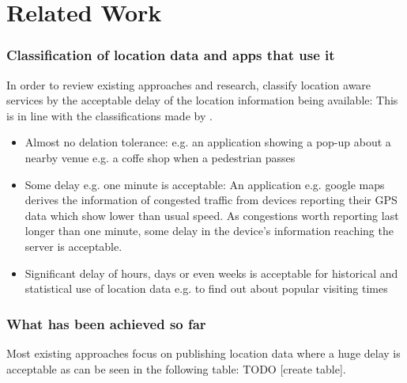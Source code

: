 \chapter{Related Work}\label{chapter:related-work}

\subsection{Classification of location data and apps that use it}
In order to review existing approaches and research, classify location aware services by the acceptable delay of the location information being available:
This is in line with the classifications made by \parencite{hoh2005protecting}.
\begin{itemize}
  \item Almost no delation tolerance: e.g. an application showing a pop-up about a nearby venue e.g. a coffe shop when a pedestrian passes
  \item Some delay e.g. one minute is acceptable: An application e.g. google maps derives the information of congested traffic from devices reporting their GPS data which show lower than usual speed. As congestions worth reporting last longer than one minute, some delay in the device's information reaching the server is acceptable.
  \item Significant delay of hours, days or even weeks is acceptable for historical and statistical use of location data e.g. to find out about popular visiting times
\end{itemize}

\subsection{What has been achieved so far}

Most existing approaches focus on publishing location data where a huge delay is acceptable as can be seen in the following table: TODO [create table].

